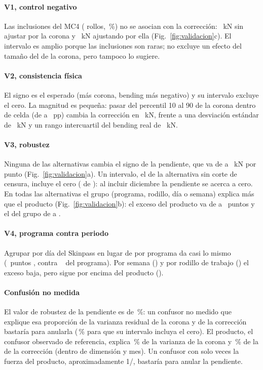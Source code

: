 \paragraph{V1, control negativo} Las inclusiones del MC4 (\NInclusiones{} rollos, \PctInclusiones\,\%) no se asocian
con la corrección: \VUnoCoef~kN \VUnoIC{} sin ajustar por la corona y \VUnoCoefAj~kN \VUnoICAj{} ajustando por ella
(Fig.~\ref{fig:validacion}c). El intervalo es amplio porque las inclusiones son raras; no excluye un efecto del tamaño
del de la corona, pero tampoco lo sugiere.

\paragraph{V2, consistencia física} El signo es el esperado (más corona, bending más negativo) y su intervalo excluye el
cero. La magnitud es pequeña: pasar del percentil 10 al 90 de la corona dentro de celda (de \VDosPdiez{} a
\VDosPnoventa~pp) cambia la corrección en \VDosCambio~kN, frente a una desviación estándar de \YDEAsoc~kN y un rango
intercuartil del bending real de \BendRealIQR~kN.

\paragraph{V3, robustez} Ninguna de las \NVariantes{} alternativas cambia el signo de la pendiente, que va de
\PendMvMin{} a \PendMvMax~kN por punto (Fig.~\ref{fig:validacion}a). Un intervalo, el de la alternativa sin corte de
censura, incluye el cero (\NVariantesICCero{} de \NVariantes): al incluir diciembre la pendiente se acerca a cero. En
todas las alternativas el grupo (programa, rodillo, día o semana) explica más que el producto
(Fig.~\ref{fig:validacion}b): el exceso del producto va de \ExcProdMvMin{} a \ExcProdMvMax~puntos y el del grupo de
\ExcGrupoMvMin{} a \ExcGrupoMvMax.

\paragraph{V4, programa contra periodo} Agrupar por día del Skinpass en lugar de por programa da casi lo mismo
(\VCuatroExcesoDia~puntos \VCuatroExcesoDiaIC, contra \VCuatroExcesoProg~\VCuatroExcesoProgIC{} del programa). Por
semana (\VCuatroExcesoSemana) y por rodillo de trabajo (\VCuatroExcesoRodillo) el exceso baja, pero sigue por encima
del producto (\VCuatroProductoProg).

\paragraph{Confusión no medida} El valor de robustez de la pendiente es de \CHRV\,\%: un confusor no medido que explique
esa proporción de la varianza residual de la corona y de la corrección bastaría para anularla (\CHRVa\,\% para que su
intervalo incluya el cero). El producto, el confusor observado de referencia, explica \CHRDRef\,\% de la varianza de la
corona y \CHRYRef\,\% de la de la corrección (dentro de dimensión y mes). Un confusor con solo \CHKAnula{} veces la fuerza
del producto, aproximadamente 1/\CHUnoEntre, bastaría para anular la pendiente.

